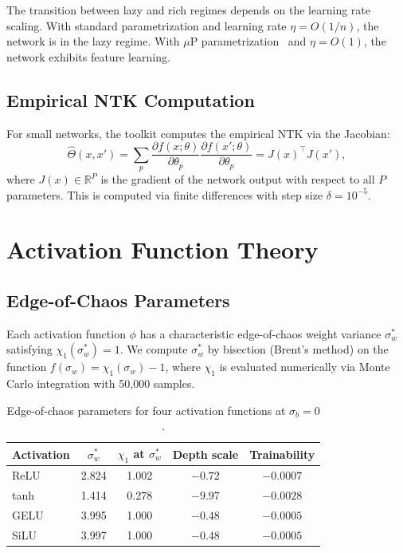 \documentclass[10pt]{article}
\theoremstyle{definition}
\begin{document}
The transition between lazy and rich regimes depends on the learning rate scaling.
With standard parametrization and learning rate $\eta = O(1/n)$, the network is in the lazy regime.
With $\mu$P parametrization~\citep{yang2021tensor} and $\eta = O(1)$, the network exhibits feature learning.

\subsection{Empirical NTK Computation}

For small networks, the toolkit computes the empirical NTK via the Jacobian:
\begin{equation}
  \hat{\Theta}(x, x') = \sum_{p} \frac{\partial f(x; \theta)}{\partial \theta_p} \frac{\partial f(x'; \theta)}{\partial \theta_p} = J(x)^\top J(x'),
\end{equation}
where $J(x) \in \mathbb{R}^{P}$ is the gradient of the network output with respect to all $P$ parameters.
This is computed via finite differences with step size $\delta = 10^{-5}$.

\section{Activation Function Theory}
\label{sec:activation}

\subsection{Edge-of-Chaos Parameters}

Each activation function $\phi$ has a characteristic edge-of-chaos weight variance $\sigma_w^*$ satisfying $\chi_1(\sigma_w^*) = 1$.
We compute $\sigma_w^*$ by bisection (Brent's method) on the function $f(\sigma_w) = \chi_1(\sigma_w) - 1$, where $\chi_1$ is evaluated numerically via Monte Carlo integration with 50{,}000 samples.

\begin{table}[htbp]
\centering
\caption{Edge-of-chaos parameters for four activation functions at $\sigma_b = 0$.}
\label{tab:activation}
\begin{tabular}{lcccc}
\toprule
Activation & $\sigma_w^*$ & $\chi_1$ at $\sigma_w^*$ & Depth scale & Trainability \\
\midrule
ReLU & 2.824 & 1.002 & $-0.72$ & $-0.0007$ \\
tanh & 1.414 & 0.278 & $-9.97$ & $-0.0028$ \\
GELU & 3.995 & 1.000 & $-0.48$ & $-0.0005$ \\
SiLU & 3.997 & 1.000 & $-0.48$ & $-0.0005$ \\
\bottomrule
\end{tabular}
\end{table}
\end{document}
